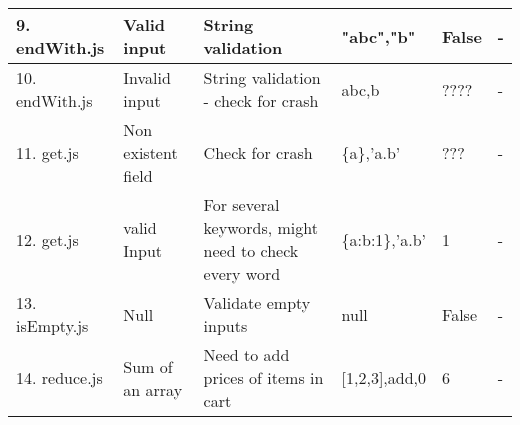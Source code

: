 \documentclass[a4paper, 12pt]{article}
\begin{document}
\begin{table}[h]
\begin{tabular}{|p{1.5cm}|p{2cm}|p{4cm}|p{2cm}|p{2cm}|p{1.5cm}|}
                9. endWith.js    & Valid input                             & String validation                                          & "abc","b"                                      & False                    & -             \\ \hline
                10. endWith.js   & Invalid input                           & String validation - check for crash                        & abc,b                                          & ????                     & -             \\ \hline
                11. get.js       & Non  existent field                     & Check for crash                                        	& \{a\},'a.b'                                    & ???                      & -             \\ \hline
                12. get.js       & valid Input                             & For several keywords, might need to check every word       & \{a:b:1\},'a.b'                                & 1                        & -             \\ \hline
                13. isEmpty.js   & Null                                    & Validate empty inputs                                      & null                                           & False                    & -             \\ \hline
                14. reduce.js    & Sum of an array                         & Need to add prices of items in cart                        & {[}1,2,3{]},add,0                              & 6                        & -             \\ \hline
            \end{tabular}
            \end{table}
            
            
            
\end{document}
